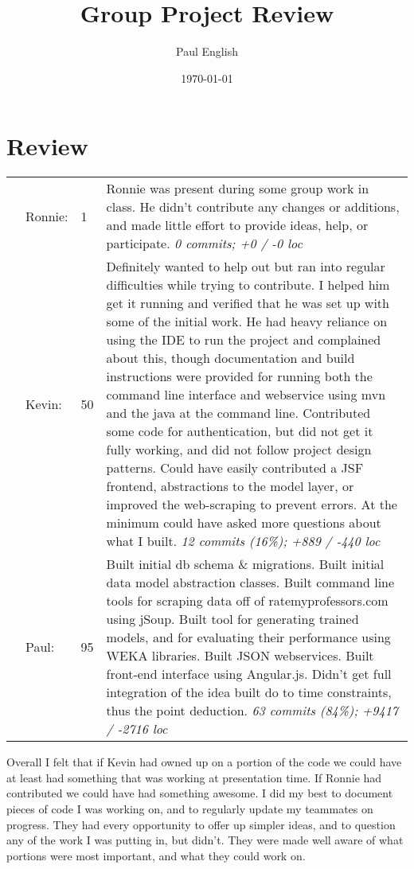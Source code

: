 \documentclass[12pt,letterpaper]{article}
\title{Group Project Review}
\date{\today}
\author{Paul English}
\begin{document}
\maketitle

\section*{Review}

\begin{listliketab}
\begin{tabular}{Lllp{12cm}}
& Ronnie: & 1 & Ronnie was present during some group work in class. He didn't contribute any changes or additions, and made little effort to provide ideas, help, or participate. \emph{0 commits; +0 / -0 loc} \\
& Kevin:  & 50 & Definitely wanted to help out but ran into regular difficulties while trying to contribute. I helped him get it running and verified that he was set up with some of the initial work. He had heavy reliance on using the IDE to run the project and complained about this, though documentation and build instructions were provided for running both the command line interface and webservice using mvn and the java at the command line. Contributed some code for authentication, but did not get it fully working, and did not follow project design patterns. Could have easily contributed a JSF frontend, abstractions to the model layer, or improved the web-scraping to prevent errors. At the minimum could have asked more questions about what I built. \emph{12 commits (16\%); +889 / -440 loc} \\
& Paul:   & 95 & Built initial db schema \& migrations. Built initial data model abstraction classes. Built command line tools for scraping data off of ratemyprofessors.com using jSoup. Built tool for generating trained models, and for evaluating their performance using WEKA libraries. Built JSON webservices. Built front-end interface using Angular.js. Didn't get full integration of the idea built do to time constraints, thus the point deduction. \emph{63 commits (84\%); +9417 / -2716 loc}
\end{tabular}
\end{listliketab}

Overall I felt that if Kevin had owned up on a portion of the code we could have at least had something that was working at presentation time. If Ronnie had contributed we could have had something awesome. I did my best to document pieces of code I was working on, and to regularly update my teammates on progress. They had every opportunity to offer up simpler ideas, and to question any of the work I was putting in, but didn't. They were made well aware of what portions were most important, and what they could work on.
\end{document}
